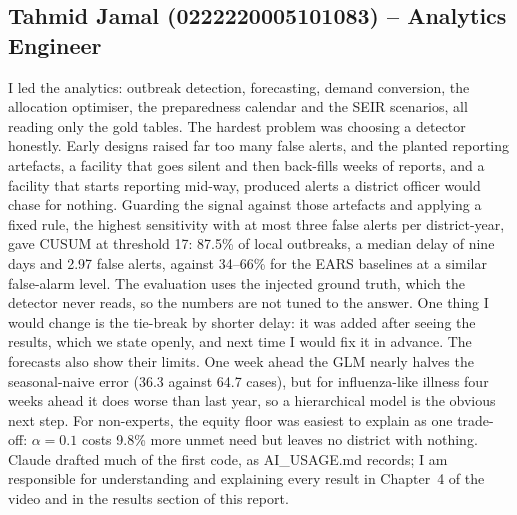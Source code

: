 \subsection*{Tahmid Jamal (0222220005101083) -- Analytics Engineer}
I led the analytics: outbreak detection, forecasting, demand conversion, the allocation optimiser, the preparedness
calendar and the SEIR scenarios, all reading only the gold tables. The hardest problem was choosing a detector
honestly. Early designs raised far too many false alerts, and the planted reporting artefacts, a facility that goes
silent and then back-fills weeks of reports, and a facility that starts reporting mid-way, produced alerts a district
officer would chase for nothing. Guarding the signal against those artefacts and applying a fixed rule, the highest
sensitivity with at most three false alerts per district-year, gave CUSUM at threshold 17: 87.5\% of local
outbreaks, a median delay of nine days and 2.97 false alerts, against 34--66\% for the EARS baselines at a similar
false-alarm level. The evaluation uses the injected ground truth, which the detector never reads, so the numbers
are not tuned to the answer. One thing I would change is the tie-break by shorter delay: it was added after seeing the
results, which we state openly, and next time I would fix it in advance. The forecasts also show their limits. One
week ahead the GLM nearly halves the seasonal-naive error (36.3 against 64.7 cases), but for influenza-like illness
four weeks ahead it does worse than last year, so a hierarchical model is the obvious next step. For non-experts,
the equity floor was easiest to explain as one trade-off: $\alpha=0.1$ costs 9.8\% more unmet need but leaves no
district with nothing. Claude drafted much of the first code, as AI\_USAGE.md records; I am responsible for
understanding and explaining every result in Chapter~4 of the video and in the results section of this report.

